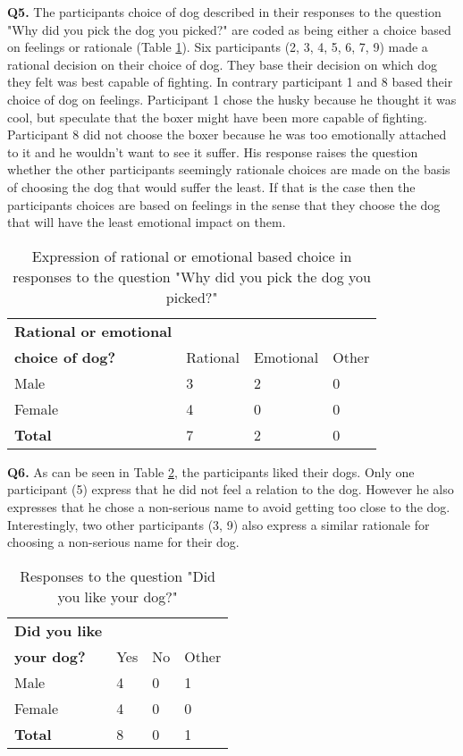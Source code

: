 \textbf{Q5.} The participants choice of dog described in their responses to the question "Why did you pick the dog you picked?" are coded as being either a choice based on feelings or rationale (Table \ref{tab:rati}). Six participants (2, 3, 4, 5, 6, 7, 9) made a rational decision on their choice of dog. They base their decision on which dog they felt was best capable of fighting. In contrary participant 1 and 8 based their choice of dog on feelings. Participant 1 chose the husky because he thought it was cool, but speculate that the boxer might have been more capable of fighting. Participant 8 did not choose the boxer because he was too emotionally attached to it and he wouldn't want to see it suffer. His response raises the question whether the other participants seemingly rationale choices are made on the basis of choosing the dog that would suffer the least. If that is the case then the participants choices are based on feelings in the sense that they choose the dog that will have the least emotional impact on them.

\begin{table}[h]
\centering
\begin{tabular}{l l l l}
\hline
\textbf{Rational or emotional}\\
\textbf{choice of dog?} & Rational & Emotional & Other \\
\hline
Male & 3 & 2 & 0 \\
Female & 4 & 0 & 0 \\
\textbf{Total} & 7 & 2 & 0 \\
\hline
\end{tabular}
\caption{\label{tab:rati}Expression of rational or emotional based choice in responses to the question "Why did you pick the dog you picked?"}
\end{table}


\textbf{Q6.} As can be seen in Table \ref{tab:like}, the participants liked their dogs. Only one participant (5) express that he did not feel a relation to the dog. However he also expresses that he chose a non-serious name to avoid getting too close to the dog. Interestingly, two other participants (3, 9) also express a similar rationale for choosing a non-serious name for their dog. 

\begin{table}[h]
\centering
\begin{tabular}{l l l l}
\hline
\textbf{Did you like}\\
\textbf{your dog?} & Yes & No & Other \\
\hline
Male & 4 & 0 & 1 \\
Female & 4 & 0 & 0 \\
\textbf{Total} & 8 & 0 & 1 \\
\hline
\end{tabular}
\caption{\label{tab:like}Responses to the question "Did you like your dog?"}
\end{table}


